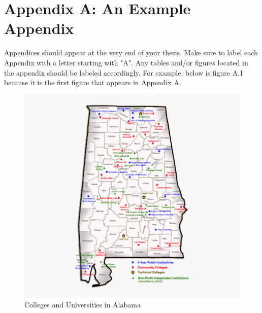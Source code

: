 
\chapter{Appendix A: An Example Appendix}%

\renewcommand{\thechapter}{A} %

Appendices should appear at the very end of your thesis. Make sure to label each Appendix with a letter starting with "A". Any tables and/or figures located in the appendix should be labeled accordingly. For example, below is figure A.1 because it is the first figure that appears in Appendix A. 


\begin{figure}[ht]
    \centering
    \includegraphics[scale=.4]{Figures/Figure A.1.png}
    \caption[Colleges and Universities in Alabama]{Colleges and Universities in Alabama}
    \label{fig a.1}
\end{figure}


